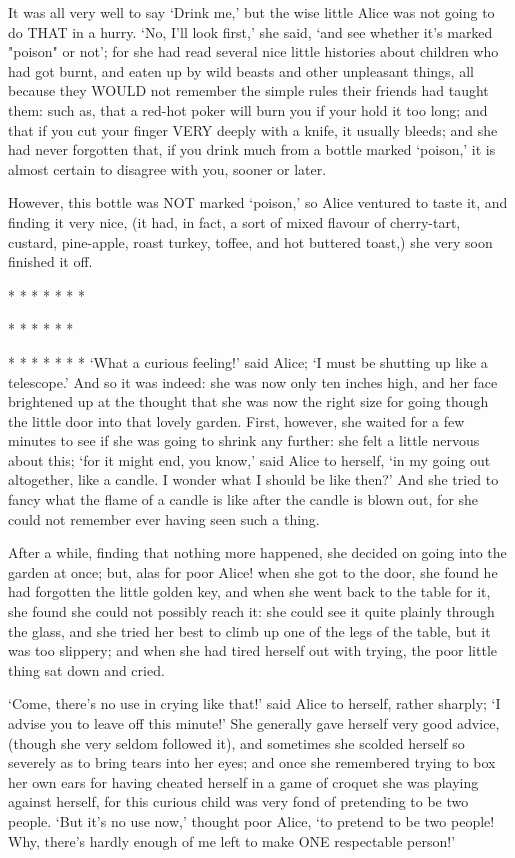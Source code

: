 \documentclass{article}
\begin{document}
It was all very well to say `Drink me,' but the wise little Alice was not going to do THAT in a hurry. `No, I'll look first,' she said, `and see whether it's marked "poison" or not'; for she had read several nice little histories about children who had got burnt, and eaten up by wild beasts and other unpleasant things, all because they WOULD not remember the simple rules their friends had taught them: such as, that a red-hot poker will burn you if your hold it too long; and that if you cut your finger VERY deeply with a knife, it usually bleeds; and she had never forgotten that, if you drink much from a bottle marked `poison,' it is almost certain to disagree with you, sooner or later.

However, this bottle was NOT marked `poison,' so Alice ventured to taste it, and finding it very nice, (it had, in fact, a sort of mixed flavour of cherry-tart, custard, pine-apple, roast turkey, toffee, and hot buttered toast,) she very soon finished it off.

     *       *       *       *       *       *       *

         *       *       *       *       *       *

     *       *       *       *       *       *       *
`What a curious feeling!' said Alice; `I must be shutting up like a telescope.'
And so it was indeed: she was now only ten inches high, and her face brightened up at the thought that she was now the right size for going though the little door into that lovely garden. First, however, she waited for a few minutes to see if she was going to shrink any further: she felt a little nervous about this; `for it might end, you know,' said Alice to herself, `in my going out altogether, like a candle. I wonder what I should be like then?' And she tried to fancy what the flame of a candle is like after the candle is blown out, for she could not remember ever having seen such a thing.

After a while, finding that nothing more happened, she decided on going into the garden at once; but, alas for poor Alice! when she got to the door, she found he had forgotten the little golden key, and when she went back to the table for it, she found she could not possibly reach it: she could see it quite plainly through the glass, and she tried her best to climb up one of the legs of the table, but it was too slippery; and when she had tired herself out with trying, the poor little thing sat down and cried.

`Come, there's no use in crying like that!' said Alice to herself, rather sharply; `I advise you to leave off this minute!' She generally gave herself very good advice, (though she very seldom followed it), and sometimes she scolded herself so severely as to bring tears into her eyes; and once she remembered trying to box her own ears for having cheated herself in a game of croquet she was playing against herself, for this curious child was very fond of pretending to be two people. `But it's no use now,' thought poor Alice, `to pretend to be two people! Why, there's hardly enough of me left to make ONE respectable person!'
\end{document}
